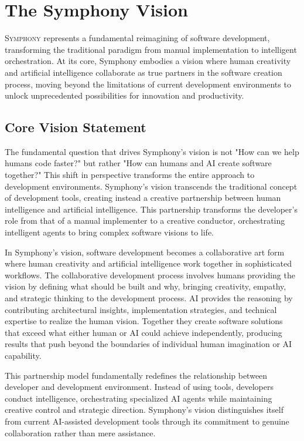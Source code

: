 
\section{The Symphony Vision}
\label{sec:symphony-vision}

\lettrine{S}{ymphony} represents a fundamental reimagining of software development, transforming the traditional paradigm from manual implementation to intelligent orchestration. At its core, Symphony embodies a vision where human creativity and artificial intelligence collaborate as true partners in the software creation process, moving beyond the limitations of current development environments to unlock unprecedented possibilities for innovation and productivity.

\subsection{Core Vision Statement}

The fundamental question that drives Symphony's vision is not "How can we help humans code faster?" but rather "How can humans and AI create software together?" This shift in perspective transforms the entire approach to development environments. Symphony's vision transcends the traditional concept of development tools, creating instead a creative partnership between human intelligence and artificial intelligence. This partnership transforms the developer's role from that of a manual implementer to a creative conductor, orchestrating intelligent agents to bring complex software visions to life.

In Symphony's vision, software development becomes a collaborative art form where human creativity and artificial intelligence work together in sophisticated workflows. The collaborative development process involves humans providing the vision by defining what should be built and why, bringing creativity, empathy, and strategic thinking to the development process. AI provides the reasoning by contributing architectural insights, implementation strategies, and technical expertise to realize the human vision. Together they create software solutions that exceed what either human or AI could achieve independently, producing results that push beyond the boundaries of individual human imagination or AI capability.

This partnership model fundamentally redefines the relationship between developer and development environment. Instead of using tools, developers conduct intelligence, orchestrating specialized AI agents while maintaining creative control and strategic direction. Symphony's vision distinguishes itself from current AI-assisted development tools through its commitment to genuine collaboration rather than mere assistance.

